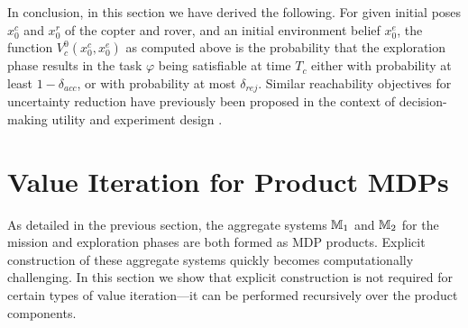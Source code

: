 \documentclass[conference]{IEEEtran}
\renewcommand{\cite}[1]{\citep{#1}}
\begin{document}
In conclusion, in this section we have derived the following. For given initial poses $x^c_0$ and $x^r_0$ of the copter and rover, and an initial environment belief $x^e_0$, the function $V^0_c(x^c_0, x^e_0)$ as computed above is the probability that the exploration phase results in the task $\varphi$ being satisfiable at time $T_c$ either with probability at least $1- \delta_{acc}$, or with probability at most $\delta_{rej}$. Similar reachability objectives for uncertainty reduction have previously been proposed in the context of decision-making utility \cite{lindley2000philosophy} and experiment design \cite{haesaert2016experiment}.


\section{ Value Iteration for Product MDPs}
\label{sec:valueiter}

As detailed in the previous section, the aggregate systems $\mathbb{M}_1$ and $\mathbb{M}_2$ for the mission and exploration phases are both formed as MDP products. Explicit construction of these aggregate systems quickly becomes computationally challenging. In this section we show that explicit construction is not required for certain types of value iteration---it can be performed recursively over the product components.
\end{document}
